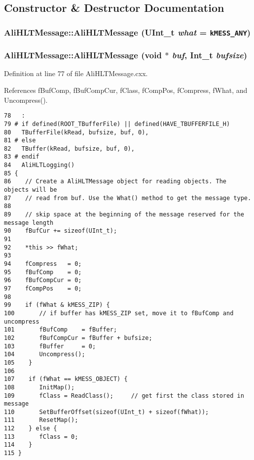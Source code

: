 \subsection{Constructor \& Destructor Documentation}
\subsubsection{\setlength{\rightskip}{0pt plus 5cm}Ali\-HLTMessage::Ali\-HLTMessage (UInt\_\-t {\em what} = {\tt kMESS\_\-ANY})}\label{classAliHLTMessage_a0}


\subsubsection{\setlength{\rightskip}{0pt plus 5cm}Ali\-HLTMessage::Ali\-HLTMessage (void $\ast$ {\em buf}, Int\_\-t {\em bufsize})}\label{classAliHLTMessage_a1}




Definition at line 77 of file Ali\-HLTMessage.cxx.

References f\-Buf\-Comp, f\-Buf\-Comp\-Cur, f\-Class, f\-Comp\-Pos, f\-Compress, f\-What, and Uncompress().

\footnotesize\begin{verbatim}78   :
79 # if defined(ROOT_TBufferFile) || defined(HAVE_TBUFFERFILE_H)
80   TBufferFile(kRead, bufsize, buf, 0),
81 # else
82   TBuffer(kRead, bufsize, buf, 0),
83 # endif
84   AliHLTLogging()
85 {
86    // Create a AliHLTMessage object for reading objects. The objects will be
87    // read from buf. Use the What() method to get the message type.
88 
89    // skip space at the beginning of the message reserved for the message length
90    fBufCur += sizeof(UInt_t);
91 
92    *this >> fWhat;
93 
94    fCompress   = 0;
95    fBufComp    = 0;
96    fBufCompCur = 0;
97    fCompPos    = 0;
98 
99    if (fWhat & kMESS_ZIP) {
100       // if buffer has kMESS_ZIP set, move it to fBufComp and uncompress
101       fBufComp    = fBuffer;
102       fBufCompCur = fBuffer + bufsize;
103       fBuffer     = 0;
104       Uncompress();
105    }
106 
107    if (fWhat == kMESS_OBJECT) {
108       InitMap();
109       fClass = ReadClass();     // get first the class stored in message
110       SetBufferOffset(sizeof(UInt_t) + sizeof(fWhat));
111       ResetMap();
112    } else {
113       fClass = 0;
114    }
115 }

\end{verbatim}\normalsize 


